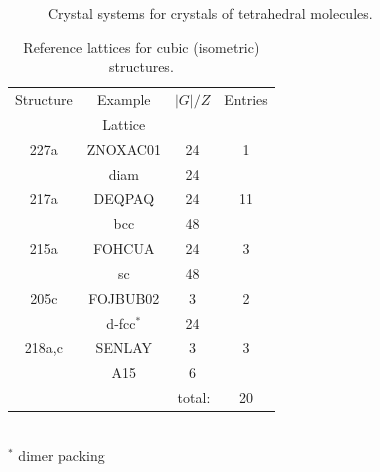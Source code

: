 \documentclass[preprint]{revtex4}              %
\begin{document}
\begin{figure}
\begin{center}
\caption[Distribution of experimental structures among the seven
crystal systems.]{Crystal systems for crystals of tetrahedral
molecules.\label{distro}}
\end{center}
\end{figure}

\begin{table}
\caption{Reference lattices for cubic (isometric) structures.}
\label{cubic}
\begin{center}
\begin{tabular}{cccc}%
\cline{1-4}
Structure & Example & $|G|/Z$ & Entries \\
        & Lattice \\
\cline{1-4}
227a    & ZNOXAC01 & 24 & 1 \\
        & diam     & 24 \\
217a    & DEQPAQ   & 24 & 11 \\
        & bcc      & 48 \\
215a    & FOHCUA   & 24 & 3 \\
        & sc       & 48 \\
205c    & FOJBUB02 &  3 & 2 \\
        & d-fcc$^*$& 24 \\
218a,c  & SENLAY   &  3 & 3 \\
        & A15      &  6 \\
\cline{4-4}
\multicolumn{3}{r}{total:} & 20 \\
\cline{1-4}
\end{tabular} \\
$^*$ dimer packing
\end{center}
\end{table}
\end{document}
